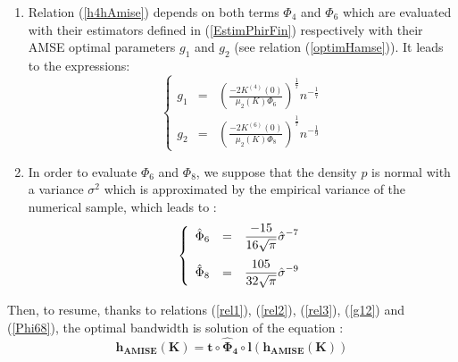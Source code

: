 {\begin{enumerate}
    which rewrites :
    \begin{equation}
      \label{rel3}
      h^{(4)}_{AMSE} = l(h_{AMISE}(K))
    \end{equation}

  \item Relation (\ref{h4hAmise}) depends on both terms $\Phi_4$ and $\Phi_6$ which are evaluated with their estimators defined in (\ref{EstimPhirFin}) respectively with their AMSE optimal parameters $g_1$ and $g_2$ (see relation (\ref{optimHamse})).  It leads to the expressions:
    \begin{equation}
      \label{g12}
      \left\{
      \begin{array}{lcl}
        g_1 & = & \displaystyle \left(\frac{-2K^{(4)}(0)}{\mu_2(K)\Phi_{6}}\right)^{\frac{1}{7}}n^{-\frac{1}{7}}\\
        g_2 & = & \displaystyle \left(\frac{-2K^{(6)}(0)}{\mu_2(K)\Phi_{8}}\right)^{\frac{1}{7}}n^{-\frac{1}{9}}
      \end{array}
      \right.
    \end{equation}

  \item In order to evaluate $\Phi_6$ and $\Phi_8$, we suppose that the density $p$ is normal with a variance $\sigma^2$ which is approximated by the empirical variance of the numerical sample, which leads to :
    \begin{equation}
      \label{Phi68}
      \left\{
      \begin{array}{lcl}
        \hat{\Phi}_6 & = & \displaystyle \frac{-15}{16\sqrt{\pi}}\hat{\sigma}^{-7}\\
        \hat{\Phi}_8 & = & \displaystyle \frac{105^{\strut}}{32\sqrt{\pi}}\hat{\sigma}^{-9}
      \end{array}
      \right.
    \end{equation}
  \end{enumerate}

  Then, to resume, thanks to relations (\ref{rel1}), (\ref{rel2}), (\ref{rel3}), (\ref{g12}) and (\ref{Phi68}), the optimal bandwidth is solution of the equation :
  \begin{equation}
    \label{equhAmise}
    \boldsymbol{h_{AMISE}(K) = t \circ \hat{\Phi}_4 \circ l (h_{AMISE}(K))}
  \end{equation}





  \vspace*{0.5cm}


}
